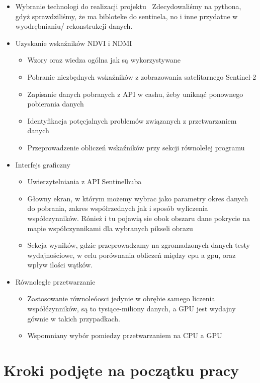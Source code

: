 \documentclass[12pt,a4paper]{article}
\begin{document}
\begin{itemize}
    \item Wybranie technologi do realizacji projektu \ Zdecydowaliśmy na pythona, gdyż sprawdziliśmy, że ma bibloteke do sentinela, no i inne przydatne w wyodrębnianiu/ rekonstrukcji danych.
    
    \item Uzyskanie wskaźników NDVI i NDMI
    \begin{itemize}
        \item Wzory oraz wiedza ogólna jak są wykorzystywane
        \item Pobranie niezbędnych wskaźników z zobrazowania satelitarnego Sentinel-2
        \item Zapisanie danych pobranych z API w cashu, żeby uniknąć ponownego pobierania danych
        \item Identyfikacja potęcjalnych problemów związanych z przetwarzaniem danych
        \item Przeprowadzenie obliczeń wskaźników przy sekcji równolełej programu
    \end{itemize}
    \item Interfejs graficzny
    \begin{itemize}
        \item Uwierzytelniania z API Sentinelhuba
        \item Głowny ekran, w którym możemy wybrac jako parametry okres danych do pobrania, zakres współrzednych jak i sposób wyliczenia współczynników.
        Rónież i tu pojawią sie obok obszaru dane pokrycie na mapie współczynnikami dla wybranych pikseli obrazu
        \item Sekcja wyników, gdzie przeprowadzamy na zgromadzonych danych testy wydajnościowe, w celu porównania obliczeń między cpu a gpu, oraz wpływ ilości wątków.
    \end{itemize}
    \item Równoległe przetwarzanie
    \begin{itemize}
        \item Zastosowanie równoleóosci jedynie w obrębie samego liczenia współćzynników, są to tysiące-miliony danych, a GPU jest wydajny gównie w takich przypadkach.
        \item Wspomniany wybór pomiedzy przetwarzaniem na CPU a GPU
    \end{itemize}
\end{itemize}

\newpage

\section{Kroki podjęte na początku pracy}
\end{document}
